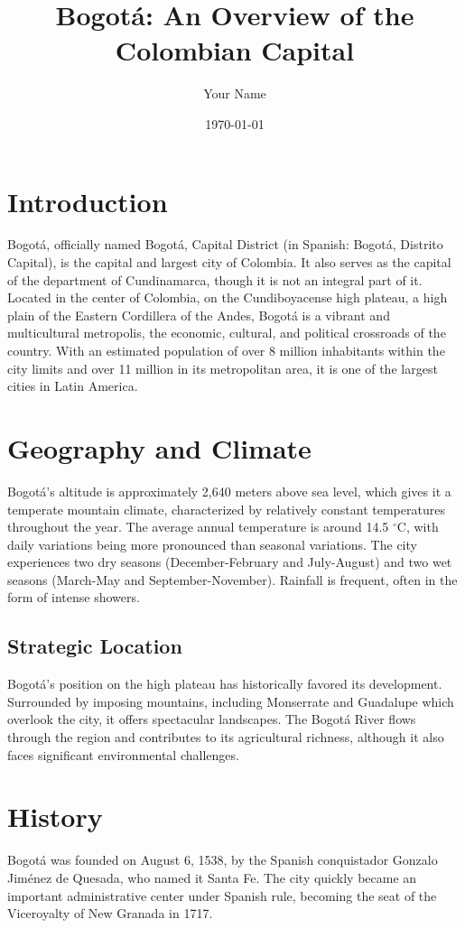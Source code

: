 \documentclass{article}
\title{Bogotá: An Overview of the Colombian Capital}
\author{Your Name}
\date{\today}
\begin{document}
\maketitle

\section{Introduction}
Bogotá, officially named Bogotá, Capital District (in Spanish: Bogotá, Distrito Capital), is the capital and largest city of Colombia. It also serves as the capital of the department of Cundinamarca, though it is not an integral part of it. Located in the center of Colombia, on the Cundiboyacense high plateau, a high plain of the Eastern Cordillera of the Andes, Bogotá is a vibrant and multicultural metropolis, the economic, cultural, and political crossroads of the country. With an estimated population of over 8 million inhabitants within the city limits and over 11 million in its metropolitan area, it is one of the largest cities in Latin America.

\section{Geography and Climate}
Bogotá's altitude is approximately 2,640 meters above sea level, which gives it a temperate mountain climate, characterized by relatively constant temperatures throughout the year. The average annual temperature is around 14.5 $^\circ$C, with daily variations being more pronounced than seasonal variations. The city experiences two dry seasons (December-February and July-August) and two wet seasons (March-May and September-November). Rainfall is frequent, often in the form of intense showers.

\subsection{Strategic Location}
Bogotá's position on the high plateau has historically favored its development. Surrounded by imposing mountains, including Monserrate and Guadalupe which overlook the city, it offers spectacular landscapes. The Bogotá River flows through the region and contributes to its agricultural richness, although it also faces significant environmental challenges.

\section{History}
Bogotá was founded on August 6, 1538, by the Spanish conquistador Gonzalo Jiménez de Quesada, who named it Santa Fe. The city quickly became an important administrative center under Spanish rule, becoming the seat of the Viceroyalty of New Granada in 1717.
\end{document}
